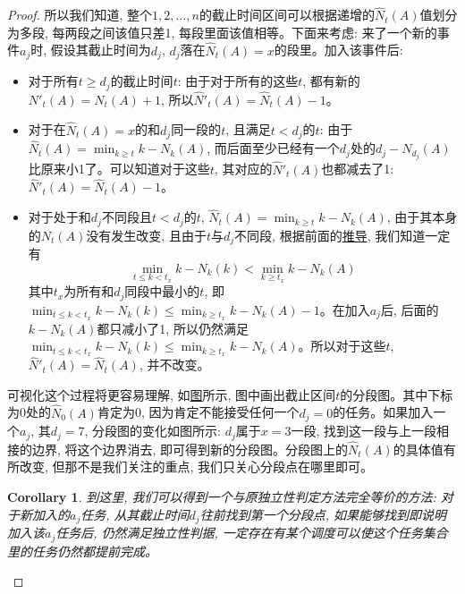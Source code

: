 \documentclass[paper=a4, fontsize=11pt]{scrartcl} %
\numberwithin{equation}{section} %
\numberwithin{figure}{section} %
\numberwithin{table}{section} %
\newtheorem{corollary}{Corollary}[theorem]
\begin{document}
\begin{enumerate}[a]
\begin{proof}
  所以我们知道, 整个$1, 2, \dots, n$的截止时间区间可以根据递增的$\hat{N}_t(A)$值划分为多段, 每两段之间该值只差1, 每段里面该值相等。下面来考虑: 来了一个新的事件$a_j$时, 假设其截止时间为$d_j$, $d_j$落在$\hat{N}_t(A) = x$的段里。加入该事件后:
  \begin{itemize}
  \item 对于所有$t \geq d_j$的截止时间$t$: 由于对于所有的这些$t$, 都有新的$N'_t(A) = N_t(A) + 1$, 所以$\hat{N}'_t(A) = \hat{N}_t(A) - 1$。
  \item 对于在$\hat{N}_t(A) = x$的和$d_j$同一段的$t$, 且满足$t < d_j$的$t$: 由于$\hat{N}_t(A) = \min_{k \geq t}{k - N_k(A)}$, 而后面至少已经有一个$d_j$处的$d_j - N_{d_j}(A)$比原来小1了。可以知道对于这些$t$, 其对应的$\hat{N}'_t(A)$也都减去了1: $\hat{N}'_t(A) = \hat{N}_t(A) - 1$。
  \item 对于处于和$d_j$不同段且$t < d_j$的$t$, $\hat{N}_t(A) = \min_{k \geq t}{k - N_k(A)}$, 由于其本身的$N_t(A)$没有发生改变, 且由于$t$与$d_j$不同段, 根据前面的\hyperref[corollary:em1]{推导}, 我们知道一定有
    \[
    \min_{t \leq k < t_x} {k - N_{k}(k)} < \min_{k \geq t_x} {k - N_{k}(A)}
    \]
    其中$t_x$为所有和$d_j$同段中最小的$t$, 即$\min_{t \leq k < t_x} {k - N_{k}(k)} \leq \min_{k \geq t_x} {k - N_{k}(A)} - 1$。在加入$a_j$后, 后面的$k - N_{k}(A)$都只减小了1, 所以仍然满足$\min_{t \leq k < t_x} {k - N_{k}(k)} \leq \min_{k \geq t_x} {k - N_{k}(A)}$。所以对于这些$t$, $\hat{N}'_t(A) = \hat{N}_t(A)$, 并不改变。
  \end{itemize}

  可视化这个过程将更容易理解, 如\hyperref[fig:vis]{图}所示, 图中画出截止区间$t$的分段图。其中下标为0处的$\hat{N}_0(A)$肯定为0, 因为肯定不能接受任何一个$d_j = 0$的任务。如果加入一个$a_j$, 其$d_j = 7$, 分段图的变化如图所示: $d_j$属于$x = 3$一段, 找到这一段与上一段相接的边界, 将这个边界消去, 即可得到新的分段图。分段图上的$\hat{N}_t(A)$的具体值有所改变, 但那不是我们关注的重点, 我们只关心分段点在哪里即可。

  \begin{corollary}
    \label{corollary:2}
    到这里, 我们可以得到一个与原独立性判定方法完全等价的方法: 对于新加入的$a_j$任务, 从其截止时间$d_j$往前找到第一个分段点, 如果能够找到即说明加入该$a_j$任务后, 仍然满足独立性判据, 一定存在有某个调度可以使这个任务集合里的任务仍然都提前完成。
  \end{corollary}


\end{proof}
\end{enumerate}
\end{document}
